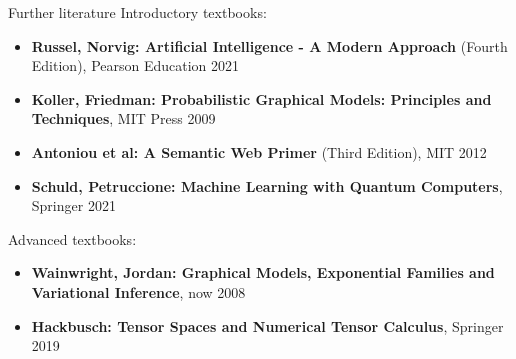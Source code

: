 \documentclass{beamer}
\begin{document}
    \begin{frame}{Further literature}
        Introductory textbooks:
        \begin{itemize}
            \item \textbf{Russel, Norvig: Artificial Intelligence - A Modern Approach} (Fourth Edition), Pearson Education 2021
            \item \textbf{Koller, Friedman: Probabilistic Graphical Models: Principles and Techniques}, MIT Press 2009
            \item \textbf{Antoniou et al: A Semantic Web Primer} (Third Edition), MIT 2012
            \item \textbf{Schuld, Petruccione: Machine Learning with Quantum Computers}, Springer 2021
        \end{itemize}

        Advanced textbooks:
        \begin{itemize}
            \item \textbf{Wainwright, Jordan: Graphical Models, Exponential Families and Variational Inference}, now 2008
            \item \textbf{Hackbusch: Tensor Spaces and Numerical Tensor Calculus}, Springer 2019
        \end{itemize}
    \end{frame}
\end{document}
